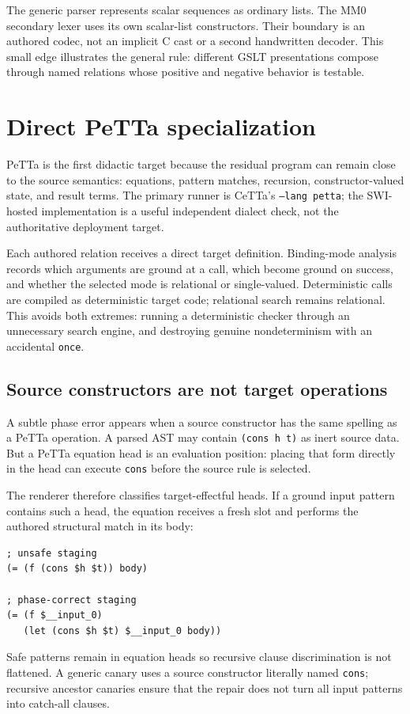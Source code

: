 \documentclass[11pt]{article}
\theoremstyle{remark}
\newcommand{\code}[1]{\texttt{#1}}
\begin{document}
The generic parser represents scalar sequences as ordinary lists.  The MM0
secondary lexer uses its own scalar-list constructors.  Their boundary is an
authored codec, not an implicit C cast or a second handwritten decoder.  This
small edge illustrates the general rule: different GSLT presentations compose
through named relations whose positive and negative behavior is testable.

\section{Direct PeTTa specialization}

PeTTa is the first didactic target because the residual program can remain
close to the source semantics: equations, pattern matches, recursion,
constructor-valued state, and result terms.  The primary runner is CeTTa's
\code{--lang petta}; the SWI-hosted implementation is a useful independent
dialect check, not the authoritative deployment target.

Each authored relation receives a direct target definition.  Binding-mode
analysis records which arguments are ground at a call, which become ground on
success, and whether the selected mode is relational or single-valued.
Deterministic calls are compiled as deterministic target code; relational
search remains relational.  This avoids both extremes: running a deterministic
checker through an unnecessary search engine, and destroying genuine
nondeterminism with an accidental \code{once}.

\subsection{Source constructors are not target operations}

A subtle phase error appears when a source constructor has the same spelling
as a PeTTa operation.  A parsed AST may contain \code{(cons h t)} as inert
source data.  But a PeTTa equation head is an evaluation position: placing that
form directly in the head can execute \code{cons} before the source rule is
selected.

The renderer therefore classifies target-effectful heads.  If a ground input
pattern contains such a head, the equation receives a fresh slot and performs
the authored structural match in its body:
\begin{lstlisting}
; unsafe staging
(= (f (cons $h $t)) body)

; phase-correct staging
(= (f $__input_0)
   (let (cons $h $t) $__input_0 body))
\end{lstlisting}
Safe patterns remain in equation heads so recursive clause discrimination is
not flattened.  A generic canary uses a source constructor literally named
\code{cons}; recursive ancestor canaries ensure that the repair does not turn
all input patterns into catch-all clauses.
\end{document}
